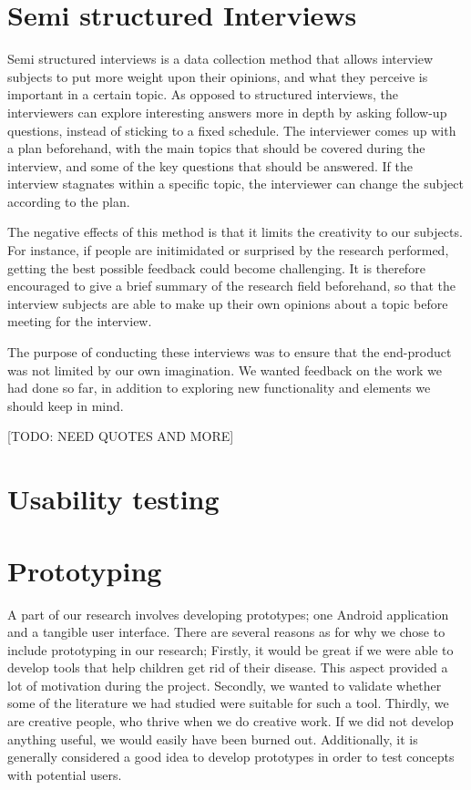 \section{Semi structured Interviews}
\label{sec:semistructuredinterviews}

Semi structured interviews is a data collection method that allows interview subjects to put more weight upon their opinions, and what they perceive is important in a certain topic. As opposed to structured interviews, the interviewers can explore interesting answers more in depth by asking follow-up questions, instead of sticking to a fixed schedule. The interviewer comes up with a plan beforehand, with the main topics that should be covered during the interview, and some of the key questions that should be answered. If the interview stagnates within a specific topic, the interviewer can change the subject according to the plan.

The negative effects of this method is that it limits the creativity to our subjects. For instance, if people are initimidated or surprised by the research performed, getting the best possible feedback could become challenging. It is therefore encouraged to give a brief summary of the research field beforehand, so that the interview subjects are able to make up their own opinions about a topic before meeting for the interview.   

The purpose of conducting these interviews was to ensure that the end-product was not limited by our own imagination. We wanted feedback on the work we had done so far, in addition to exploring new functionality and elements we should keep in mind.

[TODO: NEED QUOTES AND MORE]

\section{Usability testing}
\label{sec:usabilitytesting}
 

\section{Prototyping}
A part of our research involves developing prototypes; one Android application and a tangible user interface. There are several reasons as for why we chose to include prototyping in our research; Firstly, it would be great if we were able to develop tools that help children get rid of their disease. This aspect provided a lot of motivation during the project. Secondly, we wanted to validate whether some of the literature we had studied were suitable for such a tool. Thirdly, we are creative people, who thrive when we do creative work. If we did not develop anything useful, we would easily have been burned out. Additionally, it is generally considered a good idea to develop prototypes in order to test concepts with potential users\iref{}.
      